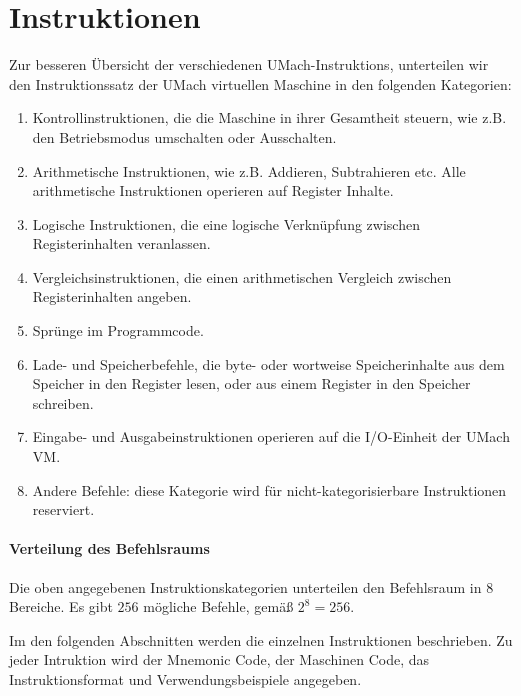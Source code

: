 \section{Instruktionen}

Zur besseren Übersicht der verschiedenen UMach-\glspl{Instruktion}, unterteilen
wir den \gls{Instruktionssatz} der UMach virtuellen Maschine in den folgenden
Kategorien:

\begin{enumerate}
  \item Kontrollinstruktionen,  die die Maschine in ihrer Gesamtheit
    steuern, wie z.B. den Betriebsmodus umschalten oder Ausschalten.
  \item Arithmetische Instruktionen, wie z.B. Addieren, Subtrahieren etc.
    Alle arithmetische Instruktionen operieren auf Register Inhalte.
  \item Logische Instruktionen, die eine logische Verknüpfung zwischen
    Registerinhalten veranlassen.
  \item Vergleichsinstruktionen, die einen arithmetischen Vergleich zwischen
    Registerinhalten angeben.
  \item Sprünge im Programmcode.
  \item Lade- und Speicherbefehle, die byte- oder wortweise Speicherinhalte
    aus dem Speicher in den Register lesen, oder aus einem Register in den
    Speicher schreiben.
  \item Eingabe- und Ausgabeinstruktionen operieren auf die I/O-Einheit der
    UMach VM.
  \item Andere Befehle: diese Kategorie wird für nicht-kategorisierbare
    Instruktionen reserviert.
\end{enumerate}

\paragraph{Verteilung des Befehlsraums}
Die oben angegebenen Instruktionskategorien unterteilen den \gls{Befehlsraum} in
8 Bereiche. Es gibt $256$ mögliche Befehle, gemäß $2^{8} = 256$.


Im den folgenden Abschnitten werden die einzelnen Instruktionen beschrieben.
Zu jeder Intruktion wird der \glqq Mnemonic Code\grqq, der Maschinen Code, das
Instruktionsformat und Verwendungsbeispiele angegeben.



